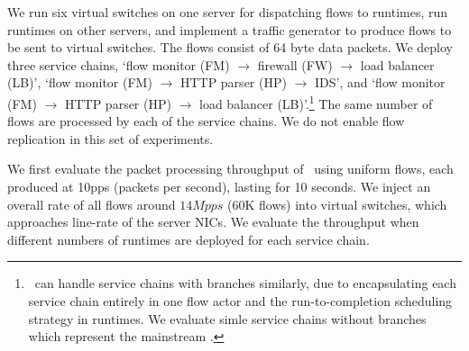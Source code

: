 
We run six virtual switches on one server for dispatching flows to runtimes, run runtimes on other servers, and implement a traffic generator to produce flows to be sent to virtual switches. The flows consist of 64 byte data packets. We deploy three service chains, `flow monitor (FM) $\rightarrow$ firewall (FW) $\rightarrow$ load balancer (LB)', `flow monitor (FM) $\rightarrow$ HTTP parser (HP) $\rightarrow$ IDS', and `flow monitor (FM) $\rightarrow$ HTTP parser (HP) $\rightarrow$ load balancer (LB)'.\footnote{\nfactor~can handle service chains with branches similarly, due to encapsulating each service chain entirely in one flow actor and the run-to-completion scheduling strategy in runtimes. We evaluate simle service chains without branches which represent the mainstream \cite{hwang2015netvm, martins2014clickos}.} The same number of flows are processed by each of the service chains. We do not enable flow replication in this set of experiments. %


We first evaluate the packet processing throughput of \nfactor~using uniform flows, each produced at 10pps (packets per second), lasting for 10 seconds. We inject an overall rate of all flows around $14Mpps$ (60K flows) into virtual switches, %
 which approaches line-rate of the server NICs. We evaluate the throughput when different numbers of runtimes are deployed for each service chain. %

